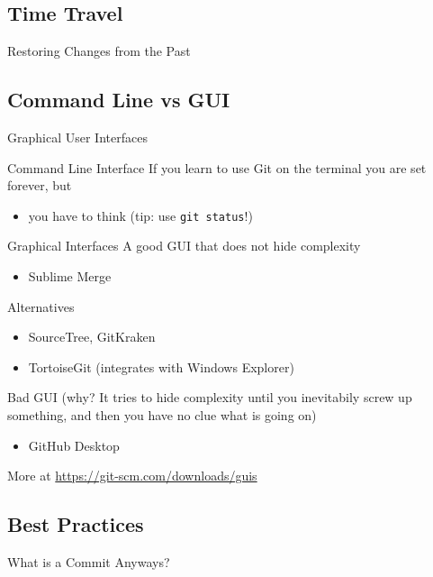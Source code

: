 \documentclass[xetex, handout]{beamer}
\begin{document}
\subsection{Time Travel}

\begin{frame}{Restoring Changes from the Past}

\end{frame}

\subsection{Command Line vs GUI}

\begin{frame}{Graphical User Interfaces}
  \begin{block}{Command Line Interface}
    If you learn to use Git on the terminal you are set forever, but
    \begin{itemize}
      \item you have to think (tip: use \texttt{git status}!)
    \end{itemize}
  \end{block}
  \begin{alertblock}{Graphical Interfaces}
    A good GUI that does not hide complexity
    \begin{itemize}
      \item Sublime Merge
    \end{itemize}
    Alternatives
    \begin{itemize}
      \item SourceTree, GitKraken
      \item TortoiseGit (integrates with Windows Explorer)
    \end{itemize}
    Bad GUI (why? It tries to hide complexity until you inevitabily screw up
    something, and then you have no clue what is going on)
    \begin{itemize}
      \item GitHub Desktop
    \end{itemize}
    More at \url{https://git-scm.com/downloads/guis}
  \end{alertblock}
\end{frame}

\subsection{Best Practices}

\begin{frame}{What is a Commit Anyways?}
\end{frame}
\end{document}
